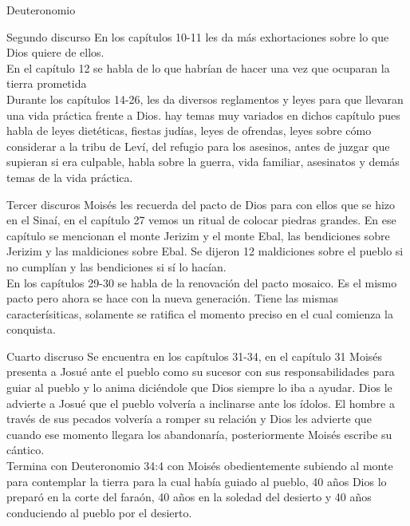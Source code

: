 \begin{section}{Deuteronomio}
\begin{subsubsection}{Segundo discurso}
		En los capítulos 10-11 les da más exhortaciones sobre lo que Dios quiere de ellos.\\
		En el capítulo 12 se habla de lo que habrían de hacer una vez que ocuparan la tierra prometida\\
		Durante los capítulos 14-26, les da diversos reglamentos y leyes para que llevaran una vida práctica frente a Dios. hay temas muy variados en dichos capítulo pues habla de leyes dietéticas, fiestas judías, leyes de ofrendas, leyes sobre cómo considerar a la tribu de Leví, del refugio para los asesinos, antes de juzgar que supieran si era culpable, habla sobre la guerra, vida familiar, asesinatos y demás temas de la vida práctica.
	\end{subsubsection}
	\begin{subsubsection}{Tercer discuros}
		Moisés les recuerda del pacto de Dios para con ellos que se hizo en el Sinaí, en el capítulo 27 vemos un ritual de colocar piedras grandes. En ese capítulo se mencionan el monte Jerizim y el monte Ebal, las bendiciones sobre Jerizim y las maldiciones sobre Ebal. Se dijeron 12 maldiciones sobre el pueblo si no cumplían y las bendiciones si sí lo hacían.\\
	En los capítulos 29-30 se habla de la renovación del pacto mosaico. Es el mismo pacto pero ahora se hace con la nueva generación. Tiene las mismas caracterísiticas, solamente se ratifica el momento preciso en el cual comienza la conquista.
	\end{subsubsection}
	\begin{subsubsection}{Cuarto discruso}
		Se encuentra en los capítulos 31-34, en el capítulo 31 Moisés presenta a Josué ante el pueblo como su sucesor con sus responsabilidades para guiar al pueblo y lo anima diciéndole que Dios siempre lo iba a ayudar. Dios le advierte a Josué que el pueblo volvería a inclinarse ante los ídolos. El hombre a través de sus pecados volvería a romper su relación y Dios les advierte que cuando ese momento llegara los abandonaría, posteriormente Moisés escribe su cántico.\\
Termina con Deuteronomio 34:4 con Moisés obedientemente subiendo al monte para contemplar la tierra para la cual había guiado al pueblo, 40 años Dios lo preparó en la corte del faraón, 40 años en la soledad del desierto y 40 años conduciendo al pueblo por el desierto.\\
	\end{subsubsection}
	
\end{section}


%


